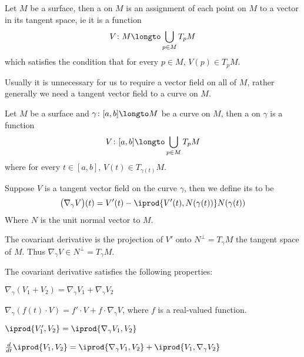\begin{defn*}

    Let $M$ be a surface, then a  on $M$ is an assignment of each point on $M$ to a vector in its tangent space, ie it is a function
    \[ V\colon M\longto\bigcup_{p\in M}T_pM \]
    which satisfies the condition that for every $p\in M$, $V(p)\in T_pM$.

\end{defn*}

Usually it is unnecessary for us to require a vector field on all of $M$, rather generally we need a tangent vector field to a curve on $M$.

\begin{defn*}

    Let $M$ be a surface and $\gamma\colon[a,b]\longto M$ be a curve on $M$, then a  on $\gamma$ is a function
    \[ V\colon [a,b]\longto\bigcup_{p\in M}T_pM \]
    where for every $t\in[a,b]$, $V(t)\in T_{\gamma(t)}M$.

\end{defn*}

\begin{defn*}

    Suppose $V$ is a tangent vector field on the curve $\gamma$, then we define its  to be
    \[ \bigl(\nabla_\gamma V\bigr)(t) = V'(t) - \iprod{V'(t),N(\gamma(t))}N(\gamma(t)) \]
    Where $N$ is the unit normal vector to $M$.

\end{defn*}

The covariant derivative is the projection of $V'$ onto $N^\perp=T_\gamma M$ the tangent space of $M$.
Thus $\nabla_\gamma V\in N^\perp = T_\gamma M$.

\begin{prop*}

    The covariant derivative satisfies the following properties:
    \benum
        \item $\nabla_\gamma(V_1+V_2)=\nabla_\gamma V_1+\nabla_\gamma V_2$
        \item $\nabla_\gamma(f(t)\cdot V)=f'\cdot V+f\cdot\nabla_\gamma V$, where $f$ is a real-valued function.
        \item $\iprod{V_1',V_2}=\iprod{\nabla_\gamma V_1,V_2}$
        \item $\frac d{dt}\iprod{V_1,V_2}=\iprod{\nabla_\gamma V_1,V_2}+\iprod{V_1,\nabla_\gamma V_2}$
    \eenum

\end{prop*}

